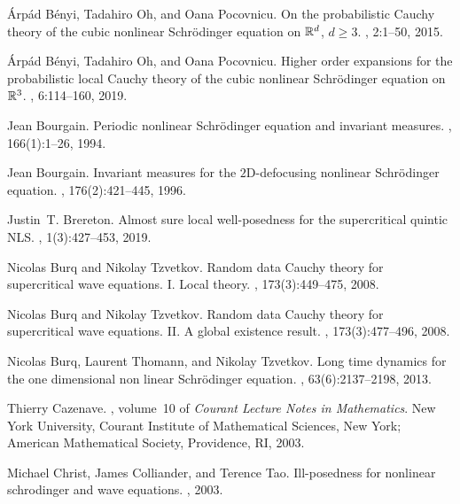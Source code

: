\documentclass[aihp]{imsart}
\numberwithin{equation}{section}
\theoremstyle{plain}
\theoremstyle{remark}
\begin{document}
\begin{thebibliography}{}
\'{A}rp\'{a}d B\'{e}nyi, Tadahiro Oh, and Oana Pocovnicu.
\newblock On the probabilistic {C}auchy theory of the cubic nonlinear
  {S}chr\"{o}dinger equation on {$\Bbb{R}^d$}, {$d\geq3$}.
, 2:1--50, 2015.

\'{A}rp\'{a}d B\'{e}nyi, Tadahiro Oh, and Oana Pocovnicu.
\newblock Higher order expansions for the probabilistic local {C}auchy theory
  of the cubic nonlinear {S}chr\"{o}dinger equation on {$\Bbb{R}^3$}.
, 6:114--160, 2019.

Jean Bourgain.
\newblock Periodic nonlinear {S}chr\"{o}dinger equation and invariant measures.
, 166(1):1--26, 1994.

Jean Bourgain.
\newblock Invariant measures for the {$2$}{D}-defocusing nonlinear
  {S}chr\"{o}dinger equation.
, 176(2):421--445, 1996.

Justin~T. Brereton.
\newblock Almost sure local well-posedness for the supercritical quintic {NLS}.
, 1(3):427--453, 2019.

Nicolas Burq and Nikolay Tzvetkov.
\newblock Random data {C}auchy theory for supercritical wave equations. {I}.
  {L}ocal theory.
, 173(3):449--475, 2008.

Nicolas Burq and Nikolay Tzvetkov.
\newblock Random data {C}auchy theory for supercritical wave equations. {II}.
  {A} global existence result.
, 173(3):477--496, 2008.

Nicolas Burq, Laurent Thomann, and Nikolay Tzvetkov.
\newblock Long time dynamics for the one dimensional non linear
  {S}chr\"{o}dinger equation.
, 63(6):2137--2198, 2013.

Thierry Cazenave.
, volume~10 of {\em
  Courant Lecture Notes in Mathematics}.
\newblock New York University, Courant Institute of Mathematical Sciences, New
  York; American Mathematical Society, Providence, RI, 2003.

Michael Christ, James Colliander, and Terence Tao.
\newblock Ill-posedness for nonlinear schrodinger and wave equations.
, 2003.


\end{thebibliography}
\end{document}
